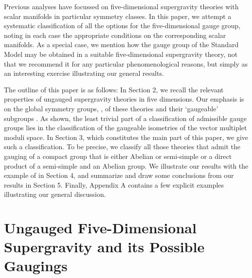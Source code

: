 \documentclass[a4paper,11pt]{article}
\begin{document}
Previous analyses have focussed on five-dimensional supergravity theories
with scalar manifolds in particular symmetry classes. In this paper, we
attempt a systematic classification of all the options for the
five-dimensional gauge group, noting in each case the appropriate
conditions on the corresponding scalar manifolds. As a special case, we
mention how the \coordHE{} gauge group of the
Standard Model may be obtained in a suitable five-dimensional supergravity
theory, not that we recommend it for any particular phenomenological
reasons, but simply as an interesting exercise illustrating our general
results.

The outline of this paper is as follows: In Section 2, we recall the
relevant properties of ungauged \coordHE{} supergravity theories in
five dimensions. Our emphasis is on the global symmetry groups, \coordHE{}, of
these theories and their `gaugeable' subgroups \coordHE{}. As shown, the
least trivial part of a classification of admissible gauge groups lies in
the classification of the gaugeable isometries of the vector multiplet
moduli space. In Section 3, which constitutes the main part of this paper,
we give such a classification.  To be precise, we classify all those
theories that admit the gauging of a compact group \coordHE{} that is either
Abelian or semi-simple or a direct product of a semi-simple and an Abelian
group. We illustrate our results with the example of \coordHE{} in Section 4, and summarize and draw some conclusions from
our results in Section 5.  Finally, Appendix A contains a few explicit
examples illustrating our general discussion.


\section{Ungauged Five-Dimensional \coordHE{} Supergravity and its
Possible Gaugings}
\setcounter{equation}{0}
\end{document}
